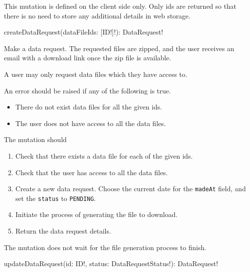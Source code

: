 \begin{note}
This mutation is defined on the client side only. Only ids are returned so that there is no need to store any additional details in web storage.
\end{note}


\begin{code}
createDataRequest(dataFileIds: [ID!]!): DataRequest!
\end{code}

Make a data request. The requested files are zipped, and the user receives an email with a download link once the zip file is available.

\restrictions

A user may only request data files which they have access to.

\errors

An error should be raised if any of the following is true.

\begin{itemize}
    \item There do not exist data files for all the given ids.
    \item The user does not have access to all the data files.
\end{itemize}

\functionality

The mutation should

\begin{enumerate}
    \item Check that there exists a data file for each of the given ids.
    \item Check that the user has access to all the data files.
    \item Create a new data request. Choose the current date for the \verb|madeAt| field, and set the \verb|status| to \verb|PENDING|.
    \item Initiate the process of generating the file to download.
    \item Return the data request details.
\end{enumerate}

\begin{note}
The mutation does not wait for the file generation process to finish.
\end{note}


\begin{code}
updateDataRequest(id: ID!, status: DataRequestStatus!): DataRequest!
\end{code}


